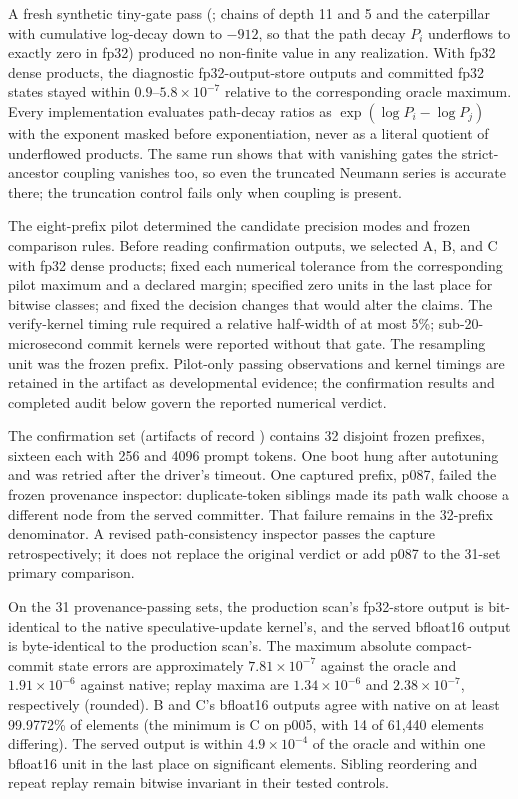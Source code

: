 \documentclass[conference]{IEEEtran}
\begin{document}
A fresh synthetic tiny-gate pass (; chains of depth 11 and 5 and the caterpillar with cumulative log-decay down to $-912$, so that the path decay $P_i$ underflows to exactly zero in fp32) produced no non-finite value in any realization. With fp32 dense products, the diagnostic fp32-output-store outputs and committed fp32 states stayed within $0.9$--$5.8\times10^{-7}$ relative to the corresponding oracle maximum. Every implementation evaluates path-decay ratios as $\exp(\log P_i-\log P_j)$ with the exponent masked before exponentiation, never as a literal quotient of underflowed products. The same run shows that with vanishing gates the strict-ancestor coupling vanishes too, so even the truncated Neumann series is accurate there; the truncation control fails only when coupling is present.

The eight-prefix pilot determined the candidate precision modes and frozen comparison rules. Before reading confirmation outputs, we selected A, B, and C with fp32 dense products; fixed each numerical tolerance from the corresponding pilot maximum and a declared margin; specified zero units in the last place for bitwise classes; and fixed the decision changes that would alter the claims. The verify-kernel timing rule required a relative half-width of at most 5\%; sub-20-microsecond commit kernels were reported without that gate. The resampling unit was the frozen prefix. Pilot-only passing observations and kernel timings are retained in the artifact as developmental evidence; the confirmation results and completed audit below govern the reported numerical verdict.

The confirmation set (artifacts of record ) contains 32 disjoint frozen prefixes, sixteen each with 256 and 4096 prompt tokens. One boot hung after autotuning and was retried after the driver's timeout. One captured prefix, p087, failed the frozen provenance inspector: duplicate-token siblings made its path walk choose a different node from the served committer. That failure remains in the 32-prefix denominator. A revised path-consistency inspector passes the capture retrospectively; it does not replace the original verdict or add p087 to the 31-set primary comparison.

On the 31 provenance-passing sets, the production scan's fp32-store output is bit-identical to the native speculative-update kernel's, and the served bfloat16 output is byte-identical to the production scan's. The maximum absolute compact-commit state errors are approximately $7.81\times10^{-7}$ against the oracle and $1.91\times10^{-6}$ against native; replay maxima are $1.34\times10^{-6}$ and $2.38\times10^{-7}$, respectively (rounded). B and C's bfloat16 outputs agree with native on at least 99.9772\% of elements (the minimum is C on p005, with 14 of 61,440 elements differing). The served output is within $4.9\times10^{-4}$ of the oracle and within one bfloat16 unit in the last place on significant elements. Sibling reordering and repeat replay remain bitwise invariant in their tested controls.
\end{document}
